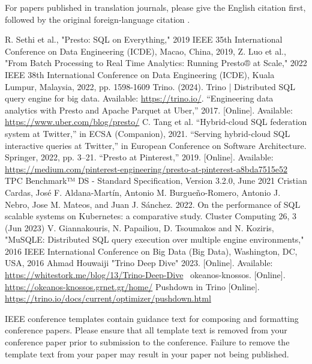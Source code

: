 \documentclass[conference]{IEEEtran}
\begin{document}
For papers published in translation journals, please give the English
citation first, followed by the original foreign-language citation \cite{b6}.

\begin{thebibliography}{00}
	 R. Sethi et al., "Presto: SQL on Everything," 2019 IEEE 35th International Conference on Data Engineering (ICDE), Macao, China, 2019,
	 Z. Luo et al., "From Batch Processing to Real Time Analytics: Running Presto® at Scale," 2022 IEEE 38th International Conference on Data Engineering (ICDE), Kuala Lumpur, Malaysia, 2022, pp. 1598-1609
	 Trino. (2024). Trino | Distributed SQL query engine for big data. Available: \href{https://trino.io/}{https://trino.io/}.
	 “Engineering data analytics with Presto and Apache Parquet at Uber,” 2017. [Online]. Available: \href{https://www.uber.com/blog/presto/}{https://www.uber.com/blog/presto/}
	 C. Tang et al. “Hybrid-cloud SQL federation system at Twitter,” in ECSA (Companion), 2021.
	 “Serving hybrid-cloud SQL interactive queries at Twitter,” in European Conference on Software Architecture. Springer, 2022, pp. 3–21.
	 “Presto at Pinterest,” 2019. [Online]. Available: \href{https://medium.com/pinterest-engineering/presto-at-pinterest-a8bda7515e52}{https://medium.com/pinterest-engineering/presto-at-pinterest-a8bda7515e52}
	 TPC Benchmark™ DS - Standard Specification, Version 3.2.0, June 2021
	 Cristian Cardas, José F. Aldana-Martín, Antonio M. Burgueño-Romero, Antonio J. Nebro, Jose M. Mateos, and Juan J. Sánchez. 2022. On the performance of SQL scalable systems on Kubernetes: a comparative study. Cluster Computing 26, 3 (Jun 2023)
	 V. Giannakouris, N. Papailiou, D. Tsoumakos and N. Koziris, "MuSQLE: Distributed SQL query execution over multiple engine environments," 2016 IEEE International Conference on Big Data (Big Data), Washington, DC, USA, 2016
	 Ahmad Houwaiji "Trino Deep Dive" 2023. [Online]. Available: \href{https://whitestork.me/blog/13/Trino-Deep-Dive}{https://whitestork.me/blog/13/Trino-Deep-Dive}
	 ~okeanos-knossos. [Online]. \href{https://okeanos-knossos.grnet.gr/home/}{https://okeanos-knossos.grnet.gr/home/}
	 Pushdown in Trino [Online]. \href{https://trino.io/docs/current/optimizer/pushdown.html}{https://trino.io/docs/current/optimizer/pushdown.html}
\end{thebibliography}
\vspace{12pt}
\color{red}
IEEE conference templates contain guidance text for composing and formatting conference papers. Please ensure that all template text is removed from your conference paper prior to submission to the conference. Failure to remove the template text from your paper may result in your paper not being published.
\end{document}

